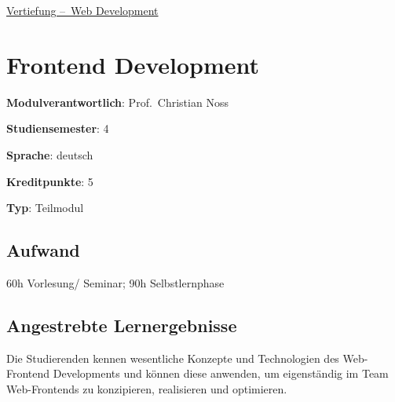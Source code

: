 \hyperref[/mi-2017/modulbeschreibungen-bachelor/BA_Vertiefung-Web_Development]{Vertiefung – Web Development}

\hypertarget{frontend-developmentpathlabelmi-2017modulbeschreibungen-bachelorba_wd_frontend-development}{%
\chapter{Frontend
Development\label{/mi-2017/modulbeschreibungen-bachelor/BA_WD_Frontend-Development}}\label{frontend-developmentpathlabelmi-2017modulbeschreibungen-bachelorba_wd_frontend-development}}

\begin{modulHead}
\textbf{Modulverantwortlich}: Prof.~Christian
Noss
\end{modulHead}
\begin{modulHead}
\textbf{Studiensemester}:
4
\end{modulHead}
\begin{modulHead}
\textbf{Sprache}:
deutsch
\end{modulHead}
\begin{modulHead}
\textbf{Kreditpunkte}:
5
\end{modulHead}
\begin{modulHead}
\textbf{Typ}:
Teilmodul
\end{modulHead}


\hypertarget{aufwandpathlabelmi-2017modulbeschreibungen-bachelorba_wd_frontend-development}{%
\section*{Aufwand\label{/mi-2017/modulbeschreibungen-bachelor/BA_WD_Frontend-Development}}\label{aufwandpathlabelmi-2017modulbeschreibungen-bachelorba_wd_frontend-development}}

60h Vorlesung/ Seminar; 90h Selbstlernphase

\hypertarget{angestrebte-lernergebnissepathlabelmi-2017modulbeschreibungen-bachelorba_wd_frontend-development}{%
\section*{Angestrebte
Lernergebnisse\label{/mi-2017/modulbeschreibungen-bachelor/BA_WD_Frontend-Development}}\label{angestrebte-lernergebnissepathlabelmi-2017modulbeschreibungen-bachelorba_wd_frontend-development}}

Die Studierenden kennen wesentliche Konzepte und Technologien des
Web-Frontend Developments und können diese anwenden, um eigenständig im
Team Web-Frontends zu konzipieren, realisieren und optimieren.

